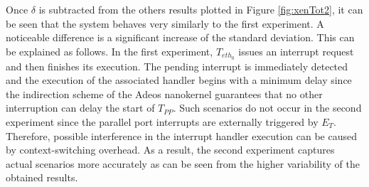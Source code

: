 \documentclass{acm_proc_article-sp}
\begin{document}
Once $\delta$ is subtracted from the others results plotted in Figure
\ref{fig:xenTot2}, it can be seen that the system behaves very similarly to the
first experiment.  A noticeable difference is a significant increase of the standard
deviation. This can be explained as follows. In the first experiment, $T_{eth_0}$
issues an interrupt request and then finishes its execution. The pending interrupt
is immediately detected and the execution of the associated handler begins with a
minimum delay since the indirection scheme of the Adeos nanokernel guarantees that
no other interruption can delay the start of $T_{PP}$. Such scenarios do not occur
in the second experiment since the parallel port interrupts are externally triggered
by $E_T$. Therefore, possible interference in the interrupt handler execution can be
caused by context-switching overhead. As a result, the second experiment captures
actual scenarios more accurately as can be seen from the higher variability of the
obtained results.

%
 
\end{document}
